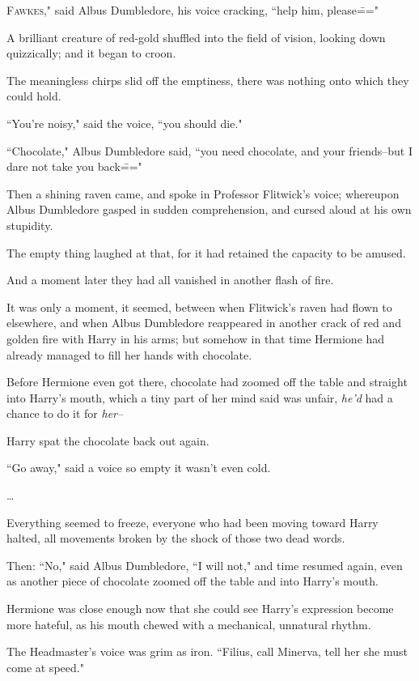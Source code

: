 
\lettrine[ante=``]{F}{awkes,"} said Albus Dumbledore, his voice cracking, ``help him, please\==="

A brilliant creature of red-gold shuffled into the field of vision, looking down quizzically; and it began to croon.

The meaningless chirps slid off the emptiness, there was nothing onto which they could hold.

``You're noisy," said the voice, ``you should die."

``Chocolate," Albus Dumbledore said, ``you need chocolate, and your friends\---but I dare not take you back\==="

Then a shining raven came, and spoke in Professor Flitwick's voice; whereupon Albus Dumbledore gasped in sudden comprehension, and cursed aloud at his own stupidity.

The empty thing laughed at that, for it had retained the capacity to be amused.

And a moment later they had all vanished in another flash of fire.

\later

It was only a moment, it seemed, between when Flitwick's raven had flown to elsewhere, and when Albus Dumbledore reappeared in another crack of red and golden fire with Harry in his arms; but somehow in that time Hermione had already managed to fill her hands with chocolate.

Before Hermione even got there, chocolate had zoomed off the table and straight into Harry's mouth, which a tiny part of her mind said was unfair, \emph{he'd} had a chance to do it for \emph{her\---}

Harry spat the chocolate back out again.

``Go away," said a voice so empty it wasn't even cold.

{\ldots}

Everything seemed to freeze, everyone who had been moving toward Harry halted, all movements broken by the shock of those two dead words.

Then: ``No," said Albus Dumbledore, ``I will not," and time resumed again, even as another piece of chocolate zoomed off the table and into Harry's mouth.

Hermione was close enough now that she could see Harry's expression become more hateful, as his mouth chewed with a mechanical, unnatural rhythm.

The Headmaster's voice was grim as iron. ``Filius, call Minerva, tell her she must come at speed."


